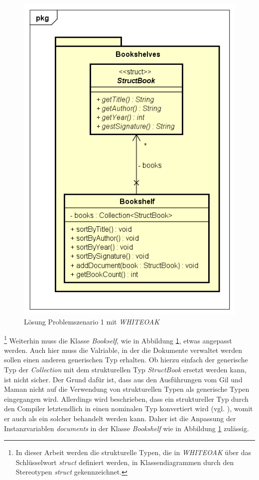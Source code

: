 \documentclass[11pt, 
ngerman,
doublespacing,
chapterinoneline, %
consistentlayout, %
]{scrartcl}
\begin{document}
\begin{figure}[h]
\centering
\includegraphics[scale=0.5]{pics/cd_loesungProlem1_whiteoak.png}
\caption{Lösung Problemszenario 1 mit \emph{WHITEOAK}\protect\footnotemark  }
\label{cd_loesungProblem1_whiteoak}
\end{figure}
\footnote{In dieser Arbeit werden die strukturelle Typen, die in \emph{WHITEOAK} über das Schlüsselwort \emph{struct} definiert werden, in Klassendiagrammen durch den Stereotypen \emph{struct} gekennzeichnet.}
Weiterhin muss die Klasse \emph{Bookself}, wie in Abbildung \ref{cd_loesungProblem1_whiteoak}, etwas angepasst werden. Auch hier muss die Valriable, in der die Dokumente verwaltet werden sollen einen anderen generischen Typ erhalten. Ob hierzu einfach der generische Typ der \emph{Collection} mit dem strukturellen Typ \emph{StructBook} ersetzt werden kann, ist nicht sicher. Der Grund dafür ist, dass aus den Ausführungen vom Gil und Maman \cite{whiteoak} nicht auf die Verwendung von strukturellen Typen als generische Typen eingegangen wird. Allerdings wird beschrieben, dass ein struktureller Typ durch den Compiler letztendlich in einen nominalen Typ konvertiert wird (vgl. \cite{whiteoak}), womit er auch als ein solcher behandelt werden kann. Daher ist die Anpassung  der Instanzvariablen \emph{documents} in der Klasse \emph{Bookshelf} wie in Abbildung \ref{cd_loesungProblem1_whiteoak} zulässig.
\end{document}
